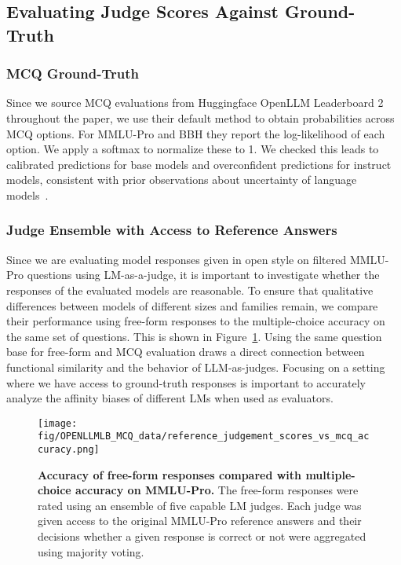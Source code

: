 \subsection{Evaluating Judge Scores Against Ground-Truth}
\label{app:judgescore_gt_comparison}

\subsubsection{MCQ Ground-Truth}

Since we source MCQ evaluations from Huggingface OpenLLM Leaderboard 2 throughout the paper, we use their default method to obtain probabilities across MCQ options. For MMLU-Pro and BBH they report the log-likelihood of each option. We apply a softmax to normalize these to 1. We checked this leads to calibrated predictions for base models and overconfident predictions for instruct models, consistent with prior observations about uncertainty of language models~\citep{openai2024gpt4technicalreport}.

\subsubsection{Judge Ensemble with Access to Reference Answers}

Since we are evaluating model responses given in open style on filtered MMLU-Pro questions using LM-as-a-judge, it is important to investigate whether the responses of the evaluated models are reasonable. To ensure that qualitative differences between models of different sizes and families remain, we compare their performance using free-form responses to the multiple-choice accuracy on the same set of questions. This is shown in Figure~\ref{fig:ref_judge-acc-plot}. Using the same question base for free-form and MCQ evaluation draws a direct connection between functional similarity and the behavior of LLM-as-judges. Focusing on a setting where we have access to ground-truth responses is important to accurately analyze the affinity biases of different LMs when used as evaluators. 

\begin{figure}
    \centering
    \texttt{[image: fig/OPENLLMLB\_MCQ\_data/reference\_judgement\_scores\_vs\_mcq\_accuracy.png]}
    \caption{\textbf{Accuracy of free-form responses compared with multiple-choice accuracy on MMLU-Pro.} The free-form responses were rated using an ensemble of five capable LM judges. Each judge was given access to the original MMLU-Pro reference answers and their decisions whether a given response is correct or not were aggregated using majority voting.}
    \label{fig:ref_judge-acc-plot}
\end{figure}

